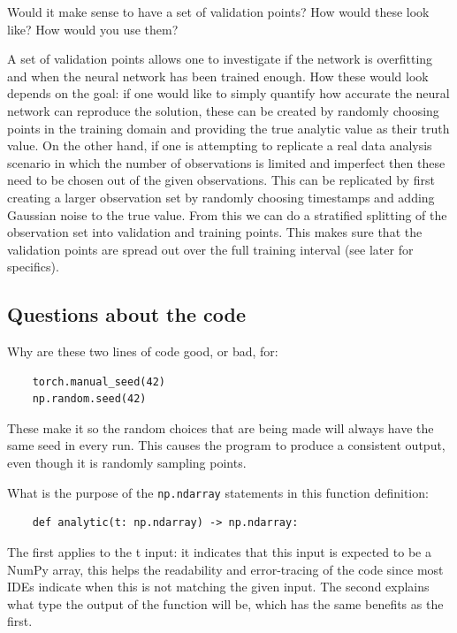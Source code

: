 \documentclass[12pt, a4paper]{report}
\begin{document}
\begin{tcolorbox}[title=Methods Question 9,sharp corners, colframe=black, colback=white]
    Would it make sense to have a set of validation points? How would these look like? How would you use them?
\end{tcolorbox}
A set of validation points allows one to investigate if the network is overfitting and when the neural network has been trained enough. How these would look depends on the goal: if one would like to simply quantify how accurate the neural network can reproduce the solution, these can be created by randomly choosing points in the training domain and providing the true analytic value as their truth value. On the other hand, if one is attempting to replicate a real data analysis scenario in which the number of observations is limited and imperfect then these need to be chosen out of the given observations. This can be replicated by first creating a larger observation set by randomly choosing timestamps and adding Gaussian noise to the true value. From this we can do a stratified splitting of the observation set into validation and training points. This makes sure that the validation points are spread out over the full training interval (see later for specifics).

\subsection*{Questions about the code}

\begin{tcolorbox}[title=Code Question 1,sharp corners, colframe=black, colback=white]
    Why are these two lines of code good, or bad, for:
    \begin{verbatim}
    torch.manual_seed(42)
    np.random.seed(42)
    \end{verbatim}
\end{tcolorbox}
These make it so the random choices that are being made will always have the same seed in every run. This causes the program to produce a consistent output, even though it is randomly sampling points. \\

\begin{tcolorbox}[title=Code Question 2,sharp corners, colframe=black, colback=white]
    What is the purpose of the \verb|np.ndarray| statements in this function definition:
    \begin{verbatim}
    def analytic(t: np.ndarray) -> np.ndarray:
    \end{verbatim}
\end{tcolorbox}
The first applies to the t input: it indicates that this input is expected to be a NumPy array, this helps the readability and error-tracing of the code since most IDEs indicate when this is not matching the given input. The second explains what type the output of the function will be, which has the same benefits as the first.\\
\end{document}
